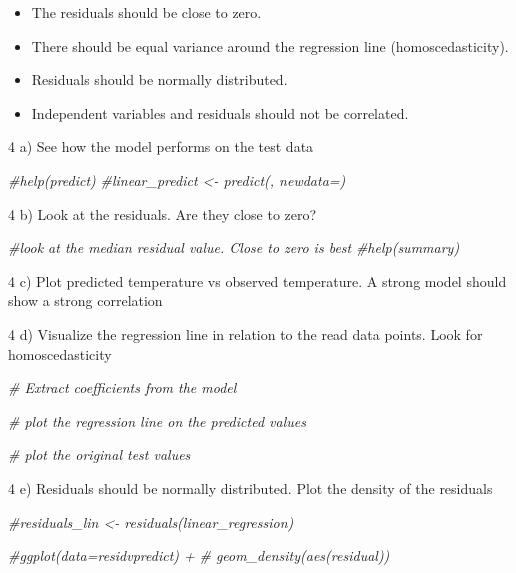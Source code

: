 \documentclass[11pt,]{article}
\newenvironment{Shaded}{\begin{snugshade}}{\end{snugshade}}
\newcommand{\CommentTok}[1]{\textcolor[rgb]{0.56,0.35,0.01}{\textit{#1}}}
\providecommand{\tightlist}{%
  \setlength{\itemsep}{0pt}\setlength{\parskip}{0pt}}
\begin{document}
\begin{itemize}
\tightlist
\item
  The residuals should be close to zero.
\item
  There should be equal variance around the regression line
  (homoscedasticity).
\item
  Residuals should be normally distributed.
\item
  Independent variables and residuals should not be correlated.
\end{itemize}

4 a) See how the model performs on the test data

\begin{Shaded}
\begin{Highlighting}[]
\CommentTok{#help(predict)}
\CommentTok{#linear_predict <- predict(, newdata=)}
\end{Highlighting}
\end{Shaded}

4 b) Look at the residuals. Are they close to zero?

\begin{Shaded}
\begin{Highlighting}[]
\CommentTok{#look at the median residual value. Close to zero is best}
\CommentTok{#help(summary)}
\end{Highlighting}
\end{Shaded}

4 c) Plot predicted temperature vs observed temperature. A strong model
should show a strong correlation

4 d) Visualize the regression line in relation to the read data points.
Look for homoscedasticity

\begin{Shaded}
\begin{Highlighting}[]
\CommentTok{# Extract coefficients from the model}

\CommentTok{# plot the regression line on the predicted values}

\CommentTok{# plot the original test values}
\end{Highlighting}
\end{Shaded}

4 e) Residuals should be normally distributed. Plot the density of the
residuals

\begin{Shaded}
\begin{Highlighting}[]
\CommentTok{#residuals_lin <- residuals(linear_regression)}

\CommentTok{#ggplot(data=residvpredict) +}
\CommentTok{#  geom_density(aes(residual))}
\end{Highlighting}
\end{Shaded}
\end{document}
